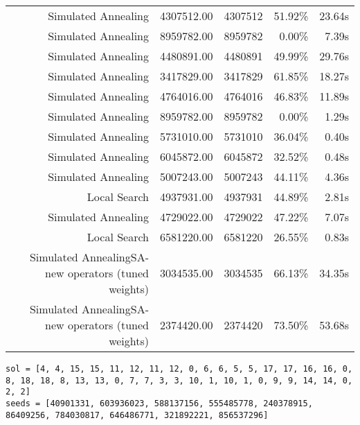 \begin{table}[ht]
\begin{tabular}{|r|r|r|r|r|}
Simulated Annealing & 4307512.00 & 4307512 & 51.92\% & 23.64s\\
Simulated Annealing & 8959782.00 & 8959782 & 0.00\% & 7.39s\\
Simulated Annealing & 4480891.00 & 4480891 & 49.99\% & 29.76s\\
Simulated Annealing & 3417829.00 & 3417829 & 61.85\% & 18.27s\\
Simulated Annealing & 4764016.00 & 4764016 & 46.83\% & 11.89s\\
Simulated Annealing & 8959782.00 & 8959782 & 0.00\% & 1.29s\\
Simulated Annealing & 5731010.00 & 5731010 & 36.04\% & 0.40s\\
Simulated Annealing & 6045872.00 & 6045872 & 32.52\% & 0.48s\\
Simulated Annealing & 5007243.00 & 5007243 & 44.11\% & 4.36s\\
Local Search & 4937931.00 & 4937931 & 44.89\% & 2.81s\\
Simulated Annealing & 4729022.00 & 4729022 & 47.22\% & 7.07s\\
Local Search & 6581220.00 & 6581220 & 26.55\% & 0.83s\\
Simulated AnnealingSA-new operators (tuned weights) & 3034535.00 & 3034535 & 66.13\% & 34.35s\\
Simulated AnnealingSA-new operators (tuned weights) & 2374420.00 & 2374420 & 73.50\% & 53.68s\\
\end{tabular}%
\end{table}
\begin{lstlisting}[label={lst:call18vehicle5},caption=Optimal solution call\_18\_vehicle\_5]
sol = [4, 4, 15, 15, 11, 12, 11, 12, 0, 6, 6, 5, 5, 17, 17, 16, 16, 0, 8, 18, 18, 8, 13, 13, 0, 7, 7, 3, 3, 10, 1, 10, 1, 0, 9, 9, 14, 14, 0, 2, 2]
seeds = [40901331, 603936023, 588137156, 555485778, 240378915, 86409256, 784030817, 646486771, 321892221, 856537296]
\end{lstlisting}%
\clearpage


